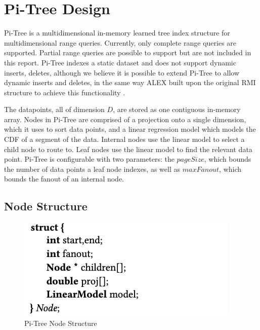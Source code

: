 \documentclass[sigconf,10pt]{acmart}
\begin{document}
\section{Pi-Tree Design}

Pi-Tree is a multidimensional in-memory learned tree index structure for
multidimensional range queries. Currently, only complete range queries are supported.
Partial range queries are possible to support but are not included in this report. 
Pi-Tree indexes a static dataset and does not support dynamic inserts, deletes,
although we believe it is possible to extend Pi-Tree to allow dynamic inserts and deletes,
in the same way ALEX built upon the original RMI structure to achieve this functionality \cite{ALEX}.

The datapoints, all of dimension $D$, are stored as one contiguous in-memory array.
Nodes in Pi-Tree are comprised of a projection onto a single dimension, which it uses to
sort data points, and a linear regression model which models the CDF of a segment of the data.
Internal nodes use the linear model to select a child node to route to.
Leaf nodes use the linear model to find the relevant data point. 
Pi-Tree is configurable with two parameters: the $pageSize$, 
which bounds the number of data points
a leaf node indexes, as well as $maxFanout$, which bounds the fanout
of an internal node.

\subsection{Node Structure}

\begin{figure}
  \includegraphics[scale=0.5]{node_structure.png}
  \caption{Pi-Tree Node Structure}
  \label{Pi-TreeNode}
\end{figure}
\end{document}
